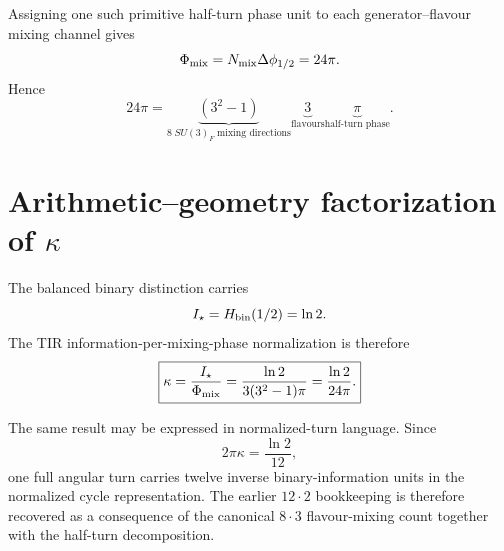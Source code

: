 Assigning one such primitive half-turn phase unit to each generator--flavour mixing channel gives
\[
\Phi_{\rm mix}
=N_{\rm mix}\Delta\phi_{1/2}
=24\pi.
\]
Hence
\[
\boxed{
24\pi
=\underbrace{(3^2-1)}_{8\;SU(3)_F\;\text{mixing directions}}
\underbrace{3}_{\text{flavours}}
\underbrace{\pi}_{\text{half-turn phase}}.
}
\]

\section{Arithmetic--geometry factorization of $\kappa$}
The balanced binary distinction carries
\[
I_\star=H_{\rm bin}(1/2)=\ln2.
\]
The TIR information-per-mixing-phase normalization is therefore
\begin{equation}
\boxed{
\kappa
=\frac{I_\star}{\Phi_{\rm mix}}
=\frac{\ln2}{3(3^2-1)\pi}
=\frac{\ln2}{24\pi}.
}
\label{eq:appP-kappa}
\end{equation}

The same result may be expressed in normalized-turn language. Since
\[
2\pi\kappa=\frac{\ln2}{12},
\]
one full angular turn carries twelve inverse binary-information units in the normalized cycle representation. The earlier $12\cdot2$ bookkeeping is therefore recovered as a consequence of the canonical $8\cdot3$ flavour-mixing count together with the half-turn decomposition.

